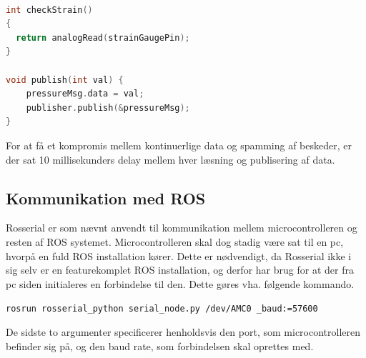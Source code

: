 \begin{lstlisting}[language=C]

int checkStrain()
{
  return analogRead(strainGaugePin);
}

void publish(int val) {
	pressureMsg.data = val;
	publisher.publish(&pressureMsg);
}

\end{lstlisting}

For at få et kompromis mellem kontinuerlige data og spamming af beskeder, er der sat 10 millisekunders delay mellem hver læsning og publisering af data. 

\subsection{Kommunikation med ROS}
Rosserial er som nævnt anvendt til kommunikation mellem microcontrolleren og resten af ROS systemet. Microcontrolleren skal dog stadig være sat til en pc, hvorpå en fuld ROS installation kører. Dette er nødvendigt, da Rosserial ikke i sig selv er en featurekomplet ROS installation, og derfor har brug for at der fra pc siden initialeres en forbindelse til den. Dette gøres vha. følgende kommando. 

	\texttt{rosrun rosserial\_python serial\_node.py /dev/AMC0 \_baud:=57600}
	
	De sidste to argumenter specificerer henholdsvis den port, som microcontrolleren befinder sig på, og den baud rate, som forbindelsen skal oprettes med.










